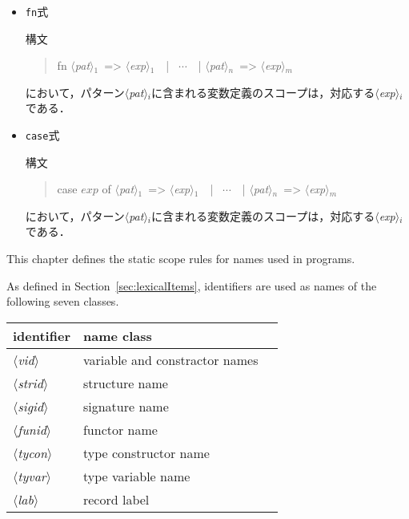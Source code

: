 \documentclass{jbook}
\newcommand{\code}[1]{\mbox{\large\tt #1}}
\newcommand{\nonterm}[1]{\mbox{$\langle$}{\it #1}\mbox{$\rangle$}}
\newenvironment{program}{\begin{quote}\begin{tt}}%
                        {\end{tt}\end{quote}}
\begin{document}
\begin{itemize}
\item \code{fn}式

構文
\begin{program}
fn \nonterm{pat}$_1$\  => \nonterm{exp}$_1$\ \ | \ $\cdots$\ \ | \nonterm{pat}$_n$\  => \nonterm{exp}$_m$
\end{program}
において，パターン\nonterm{pat}$_{i}$に含まれる変数定義のスコープは，対応する\nonterm{exp}$_i$である．

\item \code{case}式

構文
\begin{program}
case $exp$ of \nonterm{pat}$_1$\  => \nonterm{exp}$_1$\ \ | \ $\cdots$\ \ | \nonterm{pat}$_n$\  => \nonterm{exp}$_m$
\end{program}
において，パターン\nonterm{pat}$_{i}$に含まれる変数定義のスコープは，対応する\nonterm{exp}$_i$である．
\end{itemize}

\else%
	This chapter defines the static scope rules for names used in programs.

	As defined in Section~\ref{sec:lexicalItems}, identifiers are
used as names of the following seven classes.

\begin{center}
\begin{tabular}{|l|l|l|}
\hline
identifier & name class\\\hline
\nonterm{vid}   & variable and constractor names\\
\nonterm{strid} & structure name\\
\nonterm{sigid} & signature name\\
\nonterm{funid} & functor name\\
\nonterm{tycon} & type constructor name \\
\nonterm{tyvar} & type variable name \\
\nonterm{lab}   & record label\\
\hline
\end{tabular}
\end{center}
\end{document}
